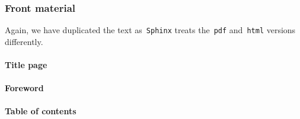\documentclass[a4paper,10pt]{article}
\newcommand{\code}[1]{\texttt{#1}}
\begin{document}
% 
% 
% 
% 
% 
% 
% 
% 
% 
% 
% 
% 

\subsubsection{Front material}

Again, we have duplicated the text as~\code{Sphinx} treats the~\code{pdf} and~\code{html} versions differently.

\paragraph{Title page}

\paragraph{Foreword}

\paragraph{Table of contents}
\end{document}

